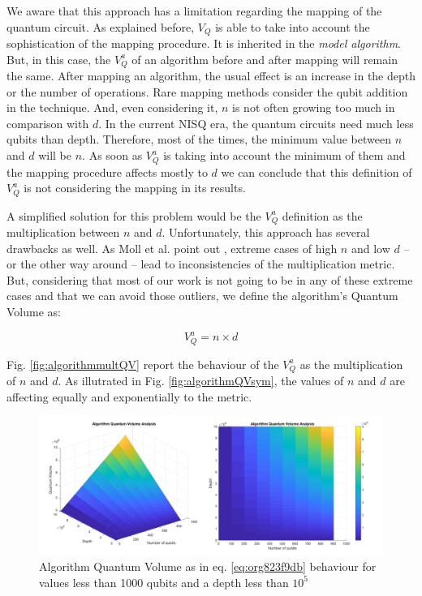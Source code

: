 \begin{itemize}
\begin{itemize}
\begin{itemize}
We aware that this approach has a limitation regarding the mapping of the quantum circuit.
As explained before, \(V_Q\) is able to take into account the sophistication of the mapping procedure.
It is inherited in the \emph{model algorithm}.
But, in this case, the \(V^a_Q\) of an algorithm before and after mapping will remain the same.
After mapping an algorithm, the usual effect is an increase in the depth or the number of operations.
Rare mapping methods consider the qubit addition in the technique.
And, even considering it, \(n\) is not often growing too much in comparison with \(d\).
In the current NISQ era, the quantum circuits need much less qubits than depth.
Therefore, most of the times, the minimum value between \(n\) and \(d\) will be \(n\).
As soon as \(V^a_Q\) is taking into account the minimum of them and the mapping procedure affects mostly to \(d\) we can conclude that this definition of \(V^a_Q\) is not considering the mapping in its results.

A simplified solution for this problem would be the \(V^a_Q\) definition as the multiplication between \(n\) and \(d\).
Unfortunately, this approach has several drawbacks as well.
As Moll et al. point out \cite{Moll_2018}, extreme cases of high \(n\) and low \(d\) -- or the other way around -- lead to inconsistencies of the multiplication metric.
But, considering that most of our work is not going to be in any of these extreme cases and that we can avoid those outliers, we define the algorithm's Quantum Volume as:

\begin{equation}
\label{eq:org823f9db}
V_Q^a =  n \times d
\end{equation}

Fig. \ref{fig:algorithmmultQV} report the behaviour of the \(V_Q^a\) as
the multiplication of \(n\) and \(d\).
As illutrated in Fig. \ref{fig:algorithmQVsym}, the values of \(n\) and \(d\) are
affecting equally and exponentially to the metric.

\begin{figure}[htbp]
\centering
\includegraphics[width=\textwidth]{figures/V_q_analysis_mult.png}
\caption{\label{fig:org20b6f97}
Algorithm Quantum Volume as in eq. \ref{eq:org823f9db} behaviour for values less than 1000 qubits and a depth less than \(10^{5}\)}
\end{figure}


\end{itemize}
\end{itemize}
\end{itemize}
